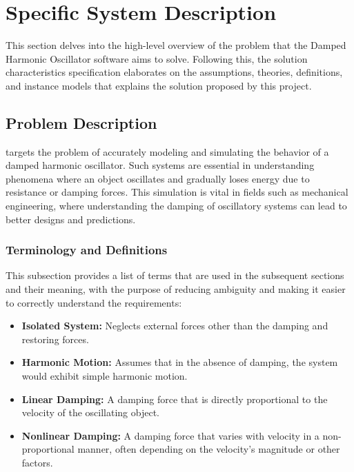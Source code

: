 \documentclass[12pt]{article}
\begin{document}
\section{Specific System Description}

This section delves into the high-level overview of the problem that the Damped 
Harmonic Oscillator software aims to solve. Following this, the solution 
characteristics specification elaborates on the assumptions, theories, definitions, 
and instance models that explains the solution proposed by this project.

\subsection{Problem Description} \label{Sec_pd}

\progname{} targets the problem of accurately modeling and simulating the behavior 
of a damped harmonic oscillator. Such systems are essential in understanding 
phenomena where an object oscillates and gradually loses energy due to resistance 
or damping forces. This simulation is vital in fields such as mechanical 
engineering, where understanding the damping of oscillatory systems can lead to 
better designs and predictions.

\subsubsection{Terminology and  Definitions}

This subsection provides a list of terms that are used in the subsequent
sections and their meaning, with the purpose of reducing ambiguity and making 
it easier to correctly understand the requirements:

\begin{itemize}

\item \textbf{Isolated System:} Neglects external forces other than the damping 
and restoring forces.
\item \textbf{Harmonic Motion:} Assumes that in the absence of damping, the system 
would exhibit simple harmonic motion.
\item \textbf{Linear Damping:} A damping force that is directly proportional to 
the velocity of the oscillating object.
\item \textbf{Nonlinear Damping:} A damping force that varies with velocity in a 
non-proportional manner, often depending on the velocity's magnitude or other factors.

\end{itemize}
\end{document}
